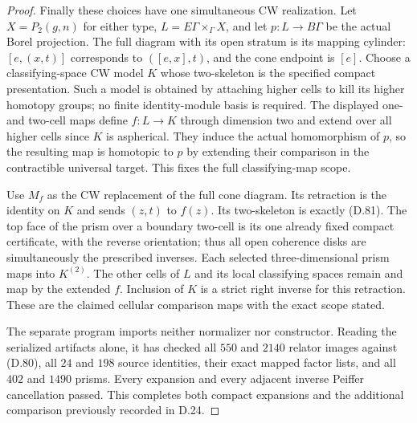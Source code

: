 \begin{proof}
Finally these choices have one simultaneous CW
realization.  Let $X=P_2(g,n)$ for either type,
$L=E\Gamma\times_\Gamma X$, and let $p:L\to B\Gamma$
be the actual Borel projection.  The full diagram
with its open stratum is its mapping cylinder:
$[e,(x,t)]$ corresponds to $([e,x],t)$, and the
cone endpoint is $[e]$.  Choose a classifying-space
CW model $K$ whose two-skeleton is the specified
compact presentation.  Such a model is obtained
by attaching higher cells to kill its higher
homotopy groups; no finite identity-module basis
is required.  The displayed one- and two-cell maps
define $f:L\to K$ through dimension two and extend
over all higher cells since $K$ is aspherical.
They induce the actual homomorphism of $p$, so
the resulting map is homotopic to $p$ by extending
their comparison in the contractible universal
target.  This fixes the full classifying-map scope.

Use $M_f$ as the CW replacement of the full cone
diagram.  Its retraction is the identity on $K$
and sends $(z,t)$ to $f(z)$.  Its two-skeleton is
exactly (D.81).  The top face of the prism over
a boundary two-cell is its one already fixed
compact certificate, with the reverse orientation;
thus all open coherence disks are simultaneously
the prescribed inverses.  Each selected
three-dimensional prism maps into $K^{(2)}$.
The other cells of $L$ and its local classifying
spaces remain and map by the extended $f$.
Inclusion of $K$ is a strict right inverse for
this retraction.  These are the claimed cellular
comparison maps with the exact scope stated.

The separate program
imports neither normalizer nor constructor.  Reading
the serialized artifacts alone, it has checked
all $550$ and $2140$ relator images against (D.80),
all $24$ and $198$ source identities, their exact
mapped factor lists, and all $402$ and $1490$
prisms.  Every expansion and every adjacent inverse
Peiffer cancellation passed.  This completes both
compact expansions and the additional comparison
previously recorded in D.24.
\end{proof}
